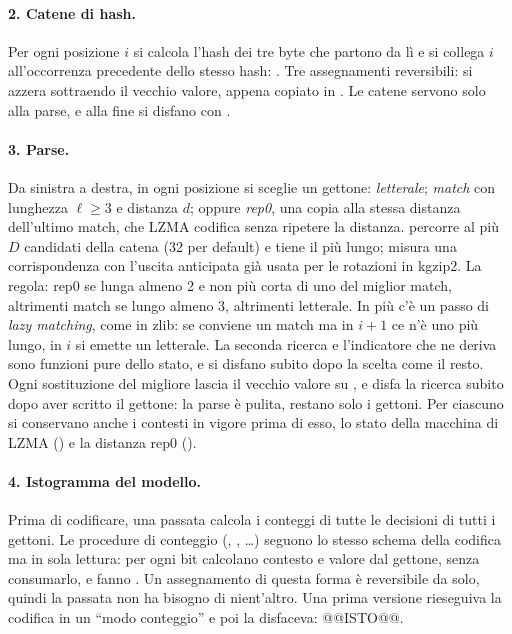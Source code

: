 \paragraph{2. Catene di hash.} Per ogni posizione $i$ si calcola l'hash dei tre byte che partono da lì e si collega $i$ all'occorrenza precedente dello stesso hash: . Tre assegnamenti reversibili:  si azzera sottraendo il vecchio valore, appena copiato in . Le catene servono solo alla parse, e alla fine si disfano con .

\paragraph{3. Parse.} Da sinistra a destra, in ogni posizione si sceglie un gettone: \emph{letterale}; \emph{match} con lunghezza $\ell \ge 3$ e distanza $d$; oppure \emph{rep0}, una copia alla stessa distanza dell'ultimo match, che LZMA codifica senza ripetere la distanza.  percorre al più $D$ candidati della catena (32 per default) e tiene il più lungo;  misura una corrispondenza con l'uscita anticipata già usata per le rotazioni in kgzip2. La regola: rep0 se lunga almeno 2 e non più corta di uno del miglior match, altrimenti match se lungo almeno 3, altrimenti letterale. In più c'è un passo di \emph{lazy matching}, come in zlib: se conviene un match ma in $i+1$ ce n'è uno più lungo, in $i$ si emette un letterale. La seconda ricerca e l'indicatore che ne deriva sono funzioni pure dello stato, e si disfano subito dopo la scelta come il resto. Ogni sostituzione del migliore lascia il vecchio valore su , e  disfa la ricerca subito dopo aver scritto il gettone: la parse è pulita, restano solo i gettoni. Per ciascuno si conservano anche i contesti in vigore prima di esso, lo stato della macchina di LZMA () e la distanza rep0 ().

\paragraph{4. Istogramma del modello.} Prima di codificare, una passata calcola i conteggi di tutte le decisioni di tutti i gettoni. Le procedure di conteggio (, , \dots) seguono lo stesso schema della codifica ma in sola lettura: per ogni bit calcolano contesto e valore dal gettone, senza consumarlo, e fanno . Un assegnamento di questa forma è reversibile da solo, quindi la passata non ha bisogno di nient'altro. Una prima versione rieseguiva la codifica in un ``modo conteggio'' e poi la disfaceva: @@ISTO@@.

